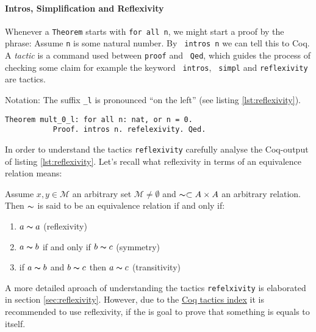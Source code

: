 	    \paragraph{Intros, Simplification and Reflexivity}
	     Whenever a \lstinline!Theorem! starts with \lstinline!for all n!, we might start a proof by the phrase:
	     Assume \lstinline!n! is some natural number. By \lstinline! intros n! we can tell this to Coq.\\
	     A {\itshape tactic} is a command used between \lstinline!proof! and \lstinline! Qed!, 
	     which guides the process of checking some claim for example the keyword \lstinline! intros!, \lstinline! simpl! and \lstinline!reflexivity! 
	     are tactics.     
	      \begin{remark}{Notation:} 
	     The suffix \lstinline!_l! is pronounced ``on the left'' (see listing \ref{lst:reflexivity}). 
	 	 \begin{lstlisting}[caption = \lstinline!mult_0_l!, label= {lst:reflexivity}]
		 Theorem mult_0_l: for all n: nat, or n = 0.
		   Proof. intros n. refelexivity. Qed.
		 \end{lstlisting}
		 \end{remark} 
	      
	    In order to understand the tactics \lstinline!reflexivity! carefully analyse the Coq-output of listing \ref{lst:reflexivity}.   
	    Let's recall what reflexivity in terms of an equivalence relation means: 
	   \begin{definition}
	   Assume $x,y\in \mathcal{M}$ an arbitrary set $\mathcal{M}\neq\emptyset$ and $\thicksim\subset A \times A $ an arbitrary relation.
	   Then $\thicksim$ is said to be an equivalence relation if and only if:
	   \begin{enumerate}
	   \item $a\thicksim a$ (reflexivity)
	   \item $a \thicksim b$ if and only if $b \thicksim c$ (symmetry)
	   \item if $a \thicksim b$ and $ b\thicksim c$ then $a \thicksim c$ (transitivity) 
	   \end{enumerate}
	   \end{definition}
	     
	    A more detailed aproach of understanding the tactics \lstinline!refelxivity! is elaborated in section \ref{sec:reflexivity}.  
	    However, due to the \href{https://pjreddie.com/coq-tactics/}{Coq tactics index} it is recommended to use reflexivity, if the is goal to prove that something is equals to itself.  
	      
